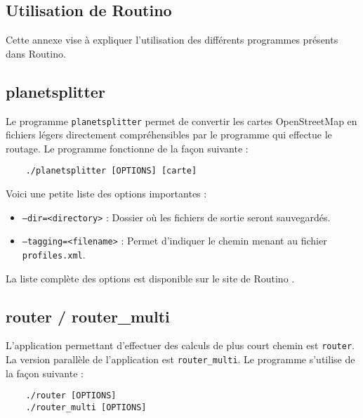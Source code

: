 \begin{appendices}
  \section{Utilisation de Routino}
  \label{ann:routino}

  Cette annexe vise à expliquer l'utilisation des différents programmes présents
  dans Routino.

  \subsection{planetsplitter}
  
  Le programme \texttt{planetsplitter} permet de convertir les cartes
OpenStreetMap en fichiers légers directement compréhensibles par le programme
qui effectue le routage. Le programme fonctionne de la façon suivante :
  
  \begin{lstlisting}
    ./planetsplitter [OPTIONS] [carte]  
  \end{lstlisting}
  \vspace{1em}

  Voici une petite liste des options importantes :
  
  \begin{itemize}
    \renewcommand{\labelitemi}{$\bullet$}
  \item \texttt{--dir=<directory>} : Dossier où les fichiers de sortie seront 
    sauvegardés.
  \item \texttt{--tagging=<filename>} : Permet d'indiquer le chemin menant au 
    fichier \texttt{profiles.xml}.
  \end{itemize}

  La liste complète des options est disponible sur le site de Routino
  \cite{bishop_routino_????}.
  
  \subsection{router / router\_multi}
  
  L'application permettant d'effectuer des calculs de plus court chemin est 
  \texttt{router}. La version parallèle de l'application est 
  \texttt{router\_multi}. Le programme s'utilise de la façon suivante : 

  \begin{lstlisting}
    ./router [OPTIONS]
    ./router_multi [OPTIONS]
  \end{lstlisting}
  \vspace{1em}


\end{appendices}
